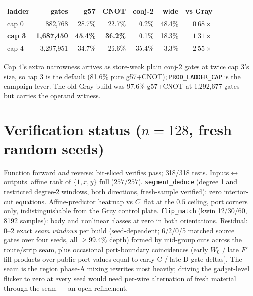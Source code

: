 \documentclass[11pt]{article}
\begin{document}
\begin{center}
\begin{tabular}{lrrrrrr}
\toprule
ladder & gates & g57 & CNOT & conj-2 & wide & vs Gray \\
\midrule
cap 0 & 882{,}768 & 28.7\% & 22.7\% & 0.2\% & 48.4\% & $0.68\times$ \\
\textbf{cap 3} & \textbf{1{,}687{,}450} & \textbf{45.4\%} & \textbf{36.2\%} & 0.1\% & 18.3\% & $\mathbf{1.31\times}$ \\
cap 4 & 3{,}297{,}951 & 34.7\% & 26.6\% & 35.4\% & 3.3\% & $2.55\times$ \\
\bottomrule
\end{tabular}
\end{center}

\noindent Cap 4's extra narrowness arrives as store-weak plain conj-2
gates at twice cap 3's size, so cap 3 is the default (81.6\% pure
g57+CNOT); \texttt{PROD\_LADDER\_CAP} is the campaign lever. The old
Gray build was 97.6\% g57+CNOT at 1{,}292{,}677 gates --- but carries
the operand witness.

\section{Verification status ($n=128$, fresh random seeds)}

Function forward \emph{and} reverse: bit-sliced verifies pass; 318/318
tests. Inputs$\leftrightarrow$outputs: affine rank of $\{1,x,y\}$ full
($257/257$). \texttt{segment\_deduce} (degree 1 and restricted degree-2
windows, both directions, fresh-sample verified): zero interior-cut
equations. Affine-predictor heatmap vs $C$: flat at the $0.5$ ceiling,
port corners only, indistinguishable from the Gray control plate.
\texttt{flip\_match} (kwin 12/30/60, 8192 samples): body and nonlinear
classes at zero in both orientations. Residual: 0--2 exact \emph{seam
windows} per build (seed-dependent; 6/2/0/5 matched source gates over
four seeds, all $\ge 99.4\%$ depth) formed by mid-group cuts across the
route/strip seam, plus occasional port-boundary coincidences (early
$W_0$ / late $F'$ fill products over public port values equal to
early-C / late-D gate deltas). The seam is the region phase-A mixing
rewrites most heavily; driving the gadget-level flicker to zero at every
seed would need per-wire alternation of fresh material through the seam
--- an open refinement.
\end{document}
